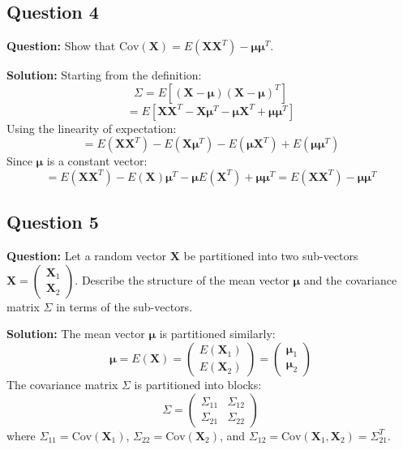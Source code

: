 \subsection*{Question 4}
\textbf{Question:} Show that $\text{Cov}(\mathbf{X}) = E(\mathbf{X}\mathbf{X}^T) - \boldsymbol{\mu}\boldsymbol{\mu}^T$.

\textbf{Solution:}
Starting from the definition:
$$ \Sigma = E[(\mathbf{X} - \boldsymbol{\mu})(\mathbf{X} - \boldsymbol{\mu})^T] $$
$$ = E[\mathbf{X}\mathbf{X}^T - \mathbf{X}\boldsymbol{\mu}^T - \boldsymbol{\mu}\mathbf{X}^T + \boldsymbol{\mu}\boldsymbol{\mu}^T] $$
Using the linearity of expectation:
$$ = E(\mathbf{X}\mathbf{X}^T) - E(\mathbf{X}\boldsymbol{\mu}^T) - E(\boldsymbol{\mu}\mathbf{X}^T) + E(\boldsymbol{\mu}\boldsymbol{\mu}^T) $$
Since $\boldsymbol{\mu}$ is a constant vector:
$$ = E(\mathbf{X}\mathbf{X}^T) - E(\mathbf{X})\boldsymbol{\mu}^T - \boldsymbol{\mu}E(\mathbf{X}^T) + \boldsymbol{\mu}\boldsymbol{\mu}^T = E(\mathbf{X}\mathbf{X}^T) - \boldsymbol{\mu}\boldsymbol{\mu}^T $$

\subsection*{Question 5}
\textbf{Question:} Let a random vector $\mathbf{X}$ be partitioned into two sub-vectors $\mathbf{X} = \begin{pmatrix} \mathbf{X}_1 \\ \mathbf{X}_2 \end{pmatrix}$. Describe the structure of the mean vector $\boldsymbol{\mu}$ and the covariance matrix $\Sigma$ in terms of the sub-vectors.

\textbf{Solution:}
The mean vector $\boldsymbol{\mu}$ is partitioned similarly:
$$ \boldsymbol{\mu} = E(\mathbf{X}) = \begin{pmatrix} E(\mathbf{X}_1) \\ E(\mathbf{X}_2) \end{pmatrix} = \begin{pmatrix} \boldsymbol{\mu}_1 \\ \boldsymbol{\mu}_2 \end{pmatrix} $$
The covariance matrix $\Sigma$ is partitioned into blocks:
$$ \Sigma = \begin{pmatrix} \Sigma_{11} & \Sigma_{12} \\ \Sigma_{21} & \Sigma_{22} \end{pmatrix} $$
where $\Sigma_{11} = \text{Cov}(\mathbf{X}_1)$, $\Sigma_{22} = \text{Cov}(\mathbf{X}_2)$, and $\Sigma_{12} = \text{Cov}(\mathbf{X}_1, \mathbf{X}_2) = \Sigma_{21}^T$.

